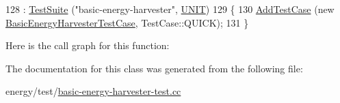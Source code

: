\begin{DoxyCode}
128   : \hyperlink{classns3_1_1TestSuite_a904b0c40583b744d30908aeb94636d1a}{TestSuite} (\textcolor{stringliteral}{"basic-energy-harvester"}, \hyperlink{classns3_1_1TestSuite_a1ebfcab34ec8161e085e8e3a1855eae0a3885375a3787abf60431f8454b3cadbd}{UNIT})
129 \{
130   \hyperlink{classns3_1_1TestCase_a3718088e3eefd5d6454569d2e0ddd835}{AddTestCase} (\textcolor{keyword}{new} \hyperlink{classBasicEnergyHarvesterTestCase}{BasicEnergyHarvesterTestCase}, TestCase::QUICK);
131 \}
\end{DoxyCode}


Here is the call graph for this function\+:




The documentation for this class was generated from the following file\+:\begin{DoxyCompactItemize}
\item 
energy/test/\hyperlink{basic-energy-harvester-test_8cc}{basic-\/energy-\/harvester-\/test.\+cc}\end{DoxyCompactItemize}
